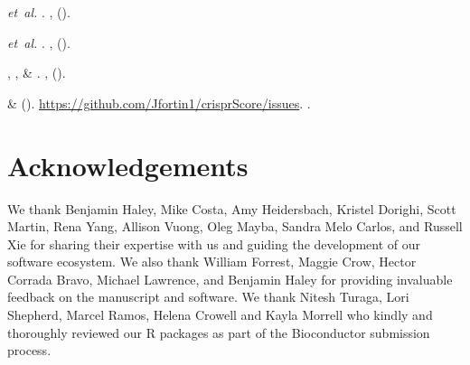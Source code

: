 \documentclass[pdftex,english,10pt]{article}
\begin{document}
{\begin{thebibliography}{100}
 \emph{et~al.}
\newblock {}.
\newblock \emph{} \textbf{},
   ().

 \emph{et~al.}
\newblock {}.
\newblock \emph{} \textbf{},
   ().

, ,
   \& 
\newblock {}.
\newblock \emph{}
  \textbf{}, 
  ().

 \& 
\newblock \emph{} ().
\newblock \urlprefix\url{https://github.com/Jfortin1/crisprScore/issues}.
\newblock {}.

\end{thebibliography}


\section*{Acknowledgements}

We thank Benjamin Haley, Mike Costa, Amy Heidersbach, Kristel Dorighi, Scott Martin, Rena Yang, Allison Vuong, Oleg Mayba, Sandra Melo Carlos, and Russell Xie for sharing their expertise with us and guiding the development of our software ecosystem. We also thank William Forrest, Maggie Crow, Hector Corrada Bravo, Michael Lawrence, and Benjamin Haley for providing invaluable feedback on the manuscript and software. We thank Nitesh Turaga, Lori Shepherd, Marcel Ramos, Helena Crowell and Kayla Morrell who kindly and thoroughly reviewed our R packages as part of the Bioconductor submission process.


}
\end{document}
